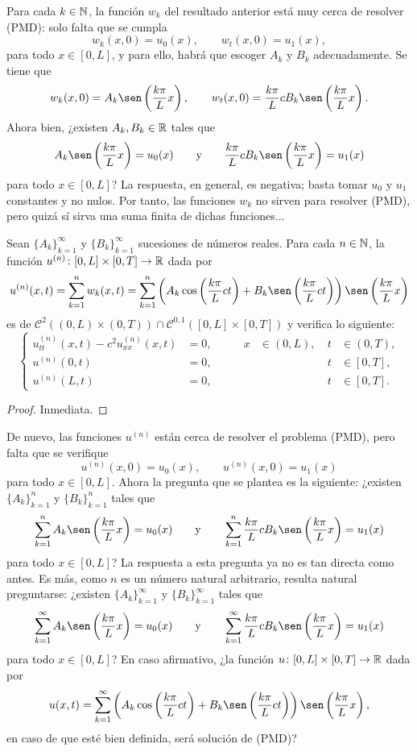\documentclass[a4paper, 12pt, extrafontsizes]{memoir}
\begin{document}
Para cada $k \in \mathbb N$, la función $w_k$ del resultado anterior está muy cerca de resolver (PMD): solo falta que se cumpla
\[w_k(x,0) = u_0(x), \qquad w_t(x,0) = u_1(x),\]
para todo $x \in [0,L]$, y para ello, habrá que escoger $A_k$ y $B_k$ adecuadamente. Se tiene que
\[w_k(x,0) = A_k\sen\left(\frac{k\pi}{L}x\right), \qquad w_t(x,0) = \frac{k\pi}{L}cB_k\sen\left(\frac{k\pi}{L}x\right).\]
Ahora bien, ¿existen $A_k, B_k \in \mathbb R$ tales que
\[A_k\sen\left(\frac{k\pi}{L}x\right) = u_0(x)\qquad \textup{y} \qquad \frac{k\pi}{L}cB_k\sen\left(\frac{k\pi}{L}x\right) = u_1(x)\]
para todo $x \in [0,L]$? La respuesta, en general, es negativa; basta tomar $u_0$ y $u_1$ constantes y no nulos. Por tanto, las funciones $w_k$ no sirven para resolver (PMD), pero quizá sí sirva una suma finita de dichas funciones...

\begin{proposition}
    Sean $\{A_k\}_{k=1}^\infty$ y $\{B_k\}_{k=1}^\infty$ sucesiones de números reales. Para cada $n \in \mathbb N$, la función $u^{(n)} \colon [0,L] \times [0,T] \to \mathbb R$ dada por
    \[u^{(n)}(x,t)=\sum_{k=1}^n w_k(x,t) = \sum_{k=1}^n\left(A_k\cos\left(\frac{k\pi}{L}ct\right)+B_k\sen\left(\frac{k\pi}{L}ct\right)\right)\sen\left(\frac{k\pi}{L}x\right)\]
    es de $\mathcal{C}^2((0,L) \times (0,T)) \cap \mathcal{C}^{0,1}([0,L] \times [0,T])$ y verifica lo siguiente:
    \[
        \left\{\begin{alignedat}{5}
            u^{(n)}_{tt}(x,t)-c^2u^{(n)}_{xx}(x,t) &= 0, \qquad & x &\in (0,L), \ & t &\in (0,T), \\
            u^{(n)}(0,t) &= 0, \qquad & & & t &\in [0,T], \\
            u^{(n)}(L,t) &= 0, \qquad & & & t &\in [0,T].
        \end{alignedat}\right.
    \]
\end{proposition}

\begin{proof}
    Inmediata.
\end{proof}

De nuevo, las funciones $u^{(n)}$ están cerca de resolver el problema (PMD), pero falta que se verifique
\[u^{(n)}(x,0) = u_0(x), \qquad u^{(n)}(x,0) = u_1(x)\]
para todo $x \in [0,L]$. Ahora la pregunta que se plantea es la siguiente: ¿existen $\{A_k\}_{k=1}^n$ y $\{B_k\}_{k=1}^n$ tales que
\[\sum_{k=1}^n A_k\sen\left(\frac{k\pi}{L}x\right) = u_0(x)\qquad \textup{y} \qquad \sum_{k=1}^n\frac{k\pi}{L}cB_k\sen\left(\frac{k\pi}{L}x\right) = u_1(x)\]
para todo $x \in [0,L]$? La respuesta a esta pregunta ya no es tan directa como antes. Es más, como $n$ es un número natural arbitrario, resulta natural preguntarse: ¿existen $\{A_k\}_{k=1}^\infty$ y $\{B_k\}_{k=1}^\infty$ tales que
\[\sum_{k=1}^\infty A_k\sen\left(\frac{k\pi}{L}x\right) = u_0(x)\qquad \textup{y} \qquad \sum_{k=1}^\infty\frac{k\pi}{L}cB_k\sen\left(\frac{k\pi}{L}x\right) = u_1(x)\]
para todo $x \in [0,L]$? En caso afirmativo, ¿la función $u \colon [0,L] \times [0,T] \to \mathbb R$ dada por
\[u(x,t) = \sum_{k=1}^\infty\left(A_k\cos\left(\frac{k\pi}{L}ct\right)+B_k\sen\left(\frac{k\pi}{L}ct\right)\right)\sen\left(\frac{k\pi}{L}x\right),\]
en caso de que esté bien definida, será solución de (PMD)? 
\end{document}
